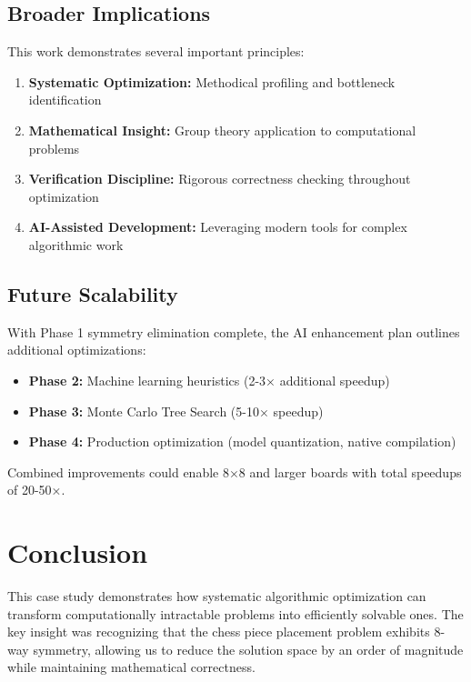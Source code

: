 \documentclass[12pt,a4paper]{article}
\theoremstyle{definition}
\begin{document}
\subsection{Broader Implications}

This work demonstrates several important principles:

\begin{enumerate}
\item \textbf{Systematic Optimization:} Methodical profiling and bottleneck identification
\item \textbf{Mathematical Insight:} Group theory application to computational problems  
\item \textbf{Verification Discipline:} Rigorous correctness checking throughout optimization
\item \textbf{AI-Assisted Development:} Leveraging modern tools for complex algorithmic work
\end{enumerate}

\subsection{Future Scalability}

With Phase 1 symmetry elimination complete, the AI enhancement plan outlines additional optimizations:

\begin{itemize}
\item \textbf{Phase 2:} Machine learning heuristics (2-3× additional speedup)
\item \textbf{Phase 3:} Monte Carlo Tree Search (5-10$\times$ speedup)  
\item \textbf{Phase 4:} Production optimization (model quantization, native compilation)
\end{itemize}

Combined improvements could enable 8$\times$8 and larger boards with total speedups of 20-50×.

\section{Conclusion}

This case study demonstrates how systematic algorithmic optimization can transform computationally intractable problems into efficiently solvable ones. The key insight was recognizing that the chess piece placement problem exhibits 8-way symmetry, allowing us to reduce the solution space by an order of magnitude while maintaining mathematical correctness.
\end{document}
